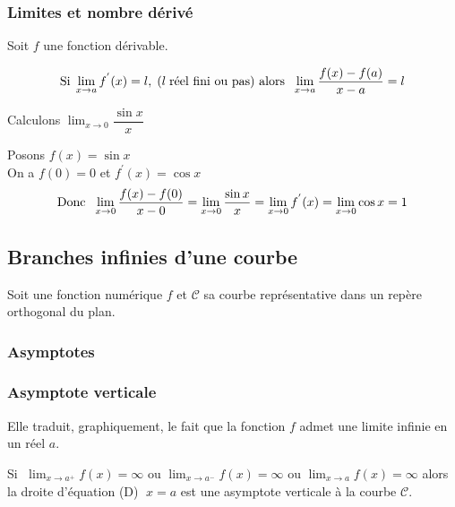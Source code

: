 \subsubsection*{Limites et nombre dérivé}

\begin{theorem}
Soit $ f $ une fonction dérivable.

\[ \text{Si}\; \displaystyle \lim_{x \to a}f^{'}(x)=l,\;  ( l \;\text{réel fini ou pas) alors \;} \displaystyle\lim_{x \to a} \dfrac{f(x)-f(a)}{x-a}=l\]
\end{theorem}

\begin{example}
Calculons $\displaystyle\lim_{x \to 0}\dfrac{\sin x}{x} $

Posons $ f(x)=\sin x $\\
On a $ f(0)=0 $ et  $ f^{'}(x)=\cos x$
 \[\text{Donc \;} \displaystyle \lim_{x \to 0} \frac{f(x)-f(0)}{x-0}=\displaystyle \lim_{x \to 0}\frac{\sin x}{x}=\displaystyle\lim_{x \to 0}f^{'}(x)=\displaystyle\lim_{x \to 0}\cos x =1\]
\end{example}

\subsection{Branches infinies d'une courbe}
Soit une fonction numérique $ f $ et $ \mathcal{C} $ sa courbe représentative dans un repère orthogonal du plan.
\subsubsection{Asymptotes}
\subsubsection*{Asymptote verticale}
Elle traduit, graphiquement, le fait que la fonction $f$ admet une limite infinie en un réel $a$.


\begin{definition}
Si $\; \displaystyle\lim_{x \to a^{+}}f(x)=\infty$  ou 
$\displaystyle\lim_{x \to a^{-}}f(x)=\infty $  ou 
$\displaystyle\lim_{x \to a}f(x)=\infty $ alors  la droite  d'équation (D) $\; x=a$ est une asymptote verticale à la courbe $\mathcal{C} $.
\end{definition}




